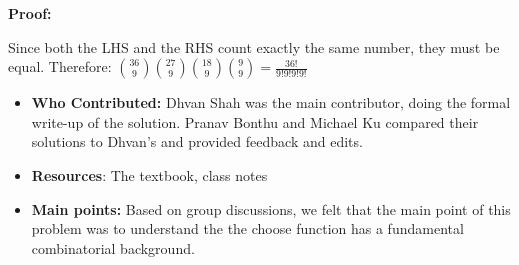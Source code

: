 \documentclass[11pt]{article}
\begin{document}
\textbf{Proof:}

Since both the LHS and the RHS count exactly the same number, they must be equal. Therefore:
$\binom{36}{9} \binom{27}{9} \binom{18}{9} \binom{9}{9} = \frac{36!}{9!9!9!9!}$

\begin{itemize}
    \item \textbf{Who Contributed:} Dhvan Shah was the main contributor, doing the formal write-up of the solution. Pranav Bonthu and Michael Ku compared their solutions to Dhvan's and provided feedback and edits.
    \item \textbf{Resources}: The textbook, class notes
    \item \textbf{Main points:} Based on group discussions, we felt that the main point of this problem was to understand the the choose function has a fundamental combinatorial background.
\end{itemize}
\end{document}
